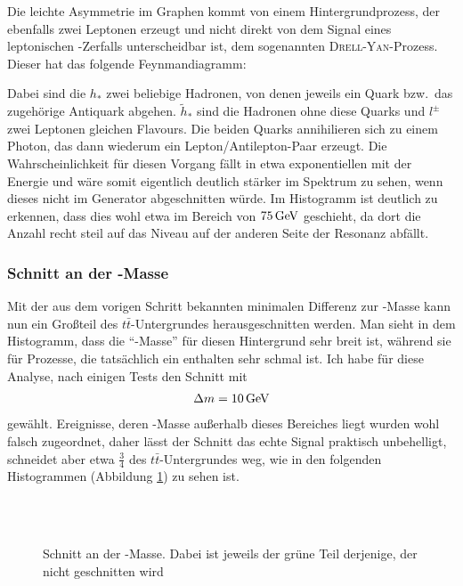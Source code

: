 Die leichte Asymmetrie im Graphen kommt von einem Hintergrundprozess, der
ebenfalls zwei Leptonen erzeugt und nicht direkt von dem Signal eines
leptonischen \Z-Zerfalls unterscheidbar ist, dem sogenannten
\textsc{Drell}-\textsc{Yan}-Prozess. Dieser hat das folgende Feynmandiagramm:
\begin{center}
  
\end{center}

Dabei sind die $h_*$ zwei beliebige Hadronen, von denen jeweils ein Quark bzw.\
das zugehörige Antiquark abgehen. $\tilde{h}_*$ sind die Hadronen ohne diese
Quarks und $l^\pm$ zwei Leptonen gleichen Flavours. Die beiden Quarks
annihilieren sich zu einem Photon, das dann wiederum ein Lepton/Antilepton-Paar
erzeugt. Die Wahrscheinlichkeit für diesen Vorgang fällt in etwa exponentiellen
mit der Energie und wäre somit eigentlich deutlich stärker im Spektrum zu sehen,
wenn dieses nicht im Generator abgeschnitten würde. Im Histogramm ist deutlich
zu erkennen, dass dies wohl etwa im Bereich von $\unit[75]{GeV}$ geschieht, da
dort die Anzahl recht steil auf das Niveau auf der anderen Seite der Resonanz
abfällt.

\subsubsection{Schnitt an der \Z-Masse}
Mit der aus dem vorigen Schritt bekannten minimalen Differenz zur \Z-Masse kann
nun ein Großteil des $t\bar{t}$-Untergrundes herausgeschnitten werden. Man sieht
in dem Histogramm, dass die "`\Z-Masse"' für diesen Hintergrund sehr breit ist,
während sie für Prozesse, die tatsächlich ein \Z enthalten sehr schmal ist. Ich
habe für diese Analyse, nach einigen Tests den Schnitt mit
\begin{align}
  \Delta m = \unit[10]{GeV}
\end{align}
gewählt. Ereignisse, deren
\Z-Masse außerhalb dieses Bereiches liegt wurden wohl falsch zugeordnet, daher
lässt der Schnitt das echte Signal praktisch unbehelligt, schneidet aber etwa
$\frac{3}{4}$ des $t\bar{t}$-Untergrundes weg, wie in den folgenden Histogrammen
(Abbildung \ref{fig:zmass_cut}) zu sehen ist.

\begin{figure}[htbp]
  \begin{center}
     \\
    \vspace{1cm}
     \\
    \vspace{1cm}
    
  \end{center}
    \caption{Schnitt an der \Z-Masse. Dabei ist jeweils der grüne Teil
    derjenige, der nicht geschnitten wird}
  \label{fig:zmass_cut}
\end{figure}

